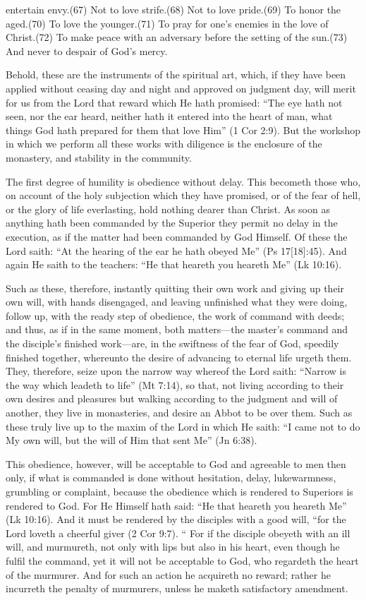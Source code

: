 entertain envy.(67) Not to love strife.(68) Not to love pride.(69) To honor the aged.(70) To love the younger.(71) To pray for one's enemies in the love of Christ.(72) To make peace with an adversary before the setting of the sun.(73) And never to despair of God's mercy.

Behold, these are the instruments of the spiritual art, which, if they have been applied without ceasing day and night and approved on judgment day, will merit for us from the Lord that reward which He hath promised: ``The eye hath not seen, nor the ear heard, neither hath it entered into the heart of man, what things God hath prepared for them that love Him'' (1 Cor 2:9). But the workshop in which we perform all these works with diligence is the enclosure of the monastery, and stability in the community.


The first degree of humility is obedience without delay. This becometh those who, on account of the holy subjection which they have promised, or of the fear of hell, or the glory of life everlasting, hold nothing dearer than Christ. As soon as anything hath been commanded by the Superior they permit no delay in the execution, as if the matter had been commanded by God Himself. Of these the Lord saith: ``At the hearing of the ear he hath obeyed Me'' (Ps 17[18]:45). And again He saith to the teachers: ``He that heareth you heareth Me'' (Lk 10:16).

Such as these, therefore, instantly quitting their own work and giving up their own will, with hands disengaged, and leaving unfinished what they were doing, follow up, with the ready step of obedience, the work of command with deeds; and thus, as if in the same moment, both matters—the master's command and the disciple's finished work—are, in the swiftness of the fear of God, speedily finished together, whereunto the desire of advancing to eternal life urgeth them. They, therefore, seize upon the narrow way whereof the Lord saith: ``Narrow is the way which leadeth to life'' (Mt 7:14), so that, not living according to their own desires and pleasures but walking according to the judgment and will of another, they live in monasteries, and desire an Abbot to be over them. Such as these truly live up to the maxim of the Lord in which He saith: ``I came not to do My own will, but the will of Him that sent Me'' (Jn 6:38).

This obedience, however, will be acceptable to God and agreeable to men then only, if what is commanded is done without hesitation, delay, lukewarmness, grumbling or complaint, because the obedience which is rendered to Superiors is rendered to God. For He Himself hath said: ``He that heareth you heareth Me'' (Lk 10:16). And it must be rendered by the disciples with a good will, ``for the Lord loveth a cheerful giver (2 Cor 9:7). `` For if the disciple obeyeth with an ill will, and murmureth, not only with lips but also in his heart, even though he fulfil the command, yet it will not be acceptable to God, who regardeth the heart of the murmurer. And for such an action he acquireth no reward; rather he incurreth the penalty of murmurers, unless he maketh satisfactory amendment.

